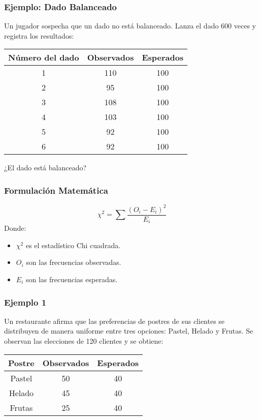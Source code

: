 \documentclass[aspectratio=169]{beamer}
\begin{document}
\begin{frame}
\frametitle{Ejemplo: Dado Balanceado}

Un jugador sospecha que un dado no está balanceado. Lanza el dado 600 veces y registra los resultados:

\begin{center}
\begin{tabular}{|c|c|c|}
\hline
Número del dado & Observados & Esperados \\
\hline
1 & 110 & 100 \\
\hline
2 & 95 & 100 \\
\hline
3 & 108 & 100 \\
\hline
4 & 103 & 100 \\
\hline
5 & 92 & 100 \\
\hline
6 & 92 & 100 \\
\hline
\end{tabular}
\end{center}

¿El dado está balanceado?

\end{frame}


\begin{frame}
\frametitle{Formulación Matemática}
\[ \chi^2 = \sum \frac{(O_i - E_i)^2}{E_i} \]
Donde:
\begin{itemize}
    \item \( \chi^2 \) es el estadístico Chi cuadrada.
    \item \( O_i \) son las frecuencias observadas.
    \item \( E_i \) son las frecuencias esperadas.
\end{itemize}
\end{frame}





\begin{frame}
\frametitle{Ejemplo 1}

Un restaurante afirma que las preferencias de postres de sus clientes se distribuyen de manera uniforme entre tres opciones: Pastel, Helado y Frutas. Se observan las elecciones de 120 clientes y se obtiene:

\begin{center}
\begin{tabular}{|c|c|c|}
\hline
Postre & Observados & Esperados \\
\hline
Pastel & 50 & 40 \\
\hline
Helado & 45 & 40 \\
\hline
Frutas & 25 & 40 \\
\hline
\end{tabular}
\end{center}
\end{frame}
\end{document}
